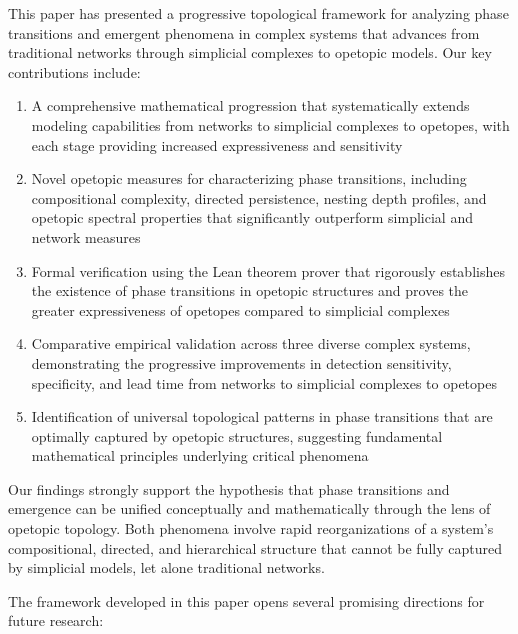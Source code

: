 This paper has presented a progressive topological framework for analyzing phase transitions and emergent phenomena in complex systems that advances from traditional networks through simplicial complexes to opetopic models. Our key contributions include:

\begin{enumerate}[leftmargin=*]
  \item A comprehensive mathematical progression that systematically extends modeling capabilities from networks to simplicial complexes to opetopes, with each stage providing increased expressiveness and sensitivity
  
  \item Novel opetopic measures for characterizing phase transitions, including compositional complexity, directed persistence, nesting depth profiles, and opetopic spectral properties that significantly outperform simplicial and network measures
  
  \item Formal verification using the Lean theorem prover that rigorously establishes the existence of phase transitions in opetopic structures and proves the greater expressiveness of opetopes compared to simplicial complexes
  
  \item Comparative empirical validation across three diverse complex systems, demonstrating the progressive improvements in detection sensitivity, specificity, and lead time from networks to simplicial complexes to opetopes
  
  \item Identification of universal topological patterns in phase transitions that are optimally captured by opetopic structures, suggesting fundamental mathematical principles underlying critical phenomena
\end{enumerate}

Our findings strongly support the hypothesis that phase transitions and emergence can be unified conceptually and mathematically through the lens of opetopic topology. Both phenomena involve rapid reorganizations of a system's compositional, directed, and hierarchical structure that cannot be fully captured by simplicial models, let alone traditional networks.

The framework developed in this paper opens several promising directions for future research:

